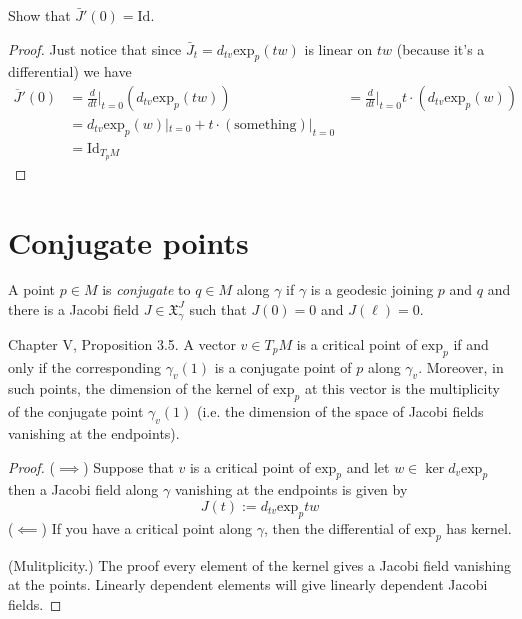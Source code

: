 \begin{exercise}
\label{exercise-Jacobi-tensor-derivative}
Show that $\bar{J}'(0)=\text{Id}$.
\end{exercise}

\begin{proof}
Just notice that since $\bar{J}_t=d_{tv}\text{exp}_p(tw)$ is linear on
$tw$ (because it's a differential) we have
\begin{align*}
\overline{J}'(0)&=\frac{d}{dt}\Big|_{t=0}(d_{tv}\text{exp}_p(tw))
&=\frac{d}{dt}\Big|_{t=0}t\cdot (d_{tv}\text{exp}_p(w))\\
&=d_{tv}\text{exp}_p(w)|_{t=0}+t\cdot(\text{something})|_{t=0}\\
& =\text{Id}_{T_pM}
\end{align*}
\end{proof}

\section{Conjugate points}
\label{section-conjugate-points}

\begin{definition}
\label{definition-conjugate-points}
A point $p \in M$ is {\it conjugate} to $q \in M$ along $\gamma$ if $\gamma$ is
a geodesic joining $p$ and $q$ and there is a Jacobi field 
$J\in\mathfrak{X}_\gamma^J$ such that $J(0)=0$ and  $J(\ell)=0$.
\end{definition}

\begin{proposition}
\label{proposition-critical-points-exp}
\cite{doc} Chapter V, Proposition 3.5. A vector $v \in T_pM$ is a critical
point of $\text{exp}_p$ if and only if the corresponding 
$\gamma_v(1)$ is a conjugate point of $p$ along $\gamma_v$.
Moreover, in such points, the dimension of the kernel of 
$\text{exp}_p$ at this vector is the multiplicity
of the conjugate point $\gamma_v(1)$ 
(i.e. the dimension of the space of Jacobi fields vanishing 
at the endpoints).
\end{proposition}

\begin{proof}
($\implies$) Suppose that $v$ is a critical point of $\text{exp}_p$ and 
let $w \in \ker d_v \text{exp}_p$ then a Jacobi field along $\gamma$ 
vanishing at the endpoints is given by
$$
J(t):=d_{tv}\text{exp}_ptw
$$
($\impliedby$) If you have a critical point along $\gamma$, then the 
differential of $\text{exp}_p$ has kernel.

(Mulitplicity.) The proof every element of the kernel gives a Jacobi
 field vanishing at the points. Linearly dependent elements will give 
 linearly dependent Jacobi fields.
\end{proof}

